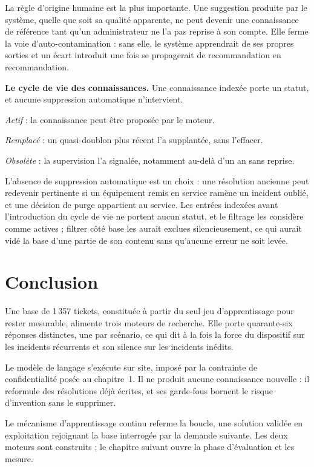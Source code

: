La règle d'origine humaine est la plus importante. Une suggestion produite par le système, quelle
que soit sa qualité apparente, ne peut devenir une connaissance de référence tant qu'un
administrateur ne l'a pas reprise à son compte. Elle ferme la voie d'auto-contamination : sans
elle, le système apprendrait de ses propres sorties et un écart introduit une fois se propagerait
de recommandation en recommandation.

\textbf{Le cycle de vie des connaissances.} Une connaissance indexée porte un statut, et aucune suppression automatique n'intervient.

\begin{puces}
  \item \emph{Actif} : la connaissance peut être proposée par le moteur.
  \item \emph{Remplacé} : un quasi-doublon plus récent l'a supplantée, sans l'effacer.
  \item \emph{Obsolète} : la supervision l'a signalée, notamment au-delà d'un an sans reprise.
\end{puces}

L'absence de suppression automatique est un choix : une résolution ancienne peut redevenir
pertinente si un équipement remis en service ramène un incident oublié, et une décision de purge
appartient au service. Les entrées indexées avant l'introduction du cycle de vie ne portent aucun
statut, et le filtrage les considère comme actives ; filtrer côté base les aurait exclues
silencieusement, ce qui aurait vidé la base d'une partie de son contenu sans qu'aucune erreur ne
soit levée.


\FloatBarrier

\section*{Conclusion}

Une base de 1\,357 tickets, constituée à partir du seul jeu d'apprentissage pour rester mesurable,
alimente trois moteurs de recherche. Elle porte quarante-six réponses distinctes, une par scénario,
ce qui dit à la fois la force du dispositif sur les incidents récurrents et son silence sur les
incidents inédits.

Le modèle de langage s'exécute sur site, imposé par la contrainte de confidentialité posée au
chapitre~1. Il ne produit aucune connaissance nouvelle : il reformule des résolutions déjà écrites,
et ses garde-fous bornent le risque d'invention sans le supprimer.

Le mécanisme d'apprentissage continu referme la boucle, une solution validée en exploitation
rejoignant la base interrogée par la demande suivante. Les deux moteurs sont construits ; le
chapitre suivant ouvre la phase d'évaluation et les mesure.
